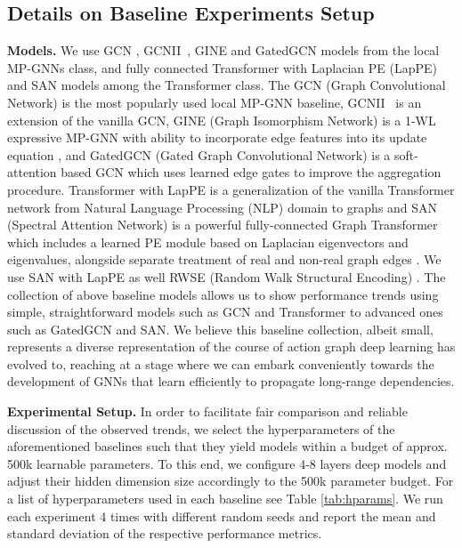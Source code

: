 \documentclass{article}
\begin{document}
\subsection{Details on Baseline Experiments Setup}

\textbf{Models.} We use GCN \cite{kipf2016gcn}, GCNII~\cite{chen2020GCNII}, GINE \cite{xu2018powerful_gin, hu2019strategies} and GatedGCN \cite{bresson2017gatedGCN} models from the local MP-GNNs class, and fully connected Transformer \cite{vaswani_2017_attention} with Laplacian PE (LapPE) \cite{dwivedi2020benchmarking, dwivedi2020generalization} and SAN \cite{kreuzer2021rethinking} models among the Transformer class. The GCN (Graph Convolutional Network) is the most popularly used local MP-GNN baseline, GCNII~\cite{chen2020GCNII} is an extension of the vanilla GCN, GINE (Graph Isomorphism Network) is a 1-WL expressive MP-GNN with ability to incorporate edge features into its update equation \cite{hu2019strategies}, and GatedGCN (Gated Graph Convolutional Network) is a soft-attention based GCN which uses learned edge gates to improve the aggregation procedure. Transformer with LapPE is a generalization of the vanilla Transformer network \cite{vaswani_2017_attention} from Natural Language Processing (NLP) domain to graphs and SAN (Spectral Attention Network) is a powerful fully-connected Graph Transformer which includes a learned PE module based on Laplacian eigenvectors and eigenvalues, alongside separate treatment of real and non-real graph edges \cite{kreuzer2021rethinking}. We use SAN with LapPE as well RWSE (Random Walk Structural Encoding) \cite{dwivedi2022graph}. The collection of above baseline models allows us to show performance trends using simple, straightforward models such as GCN and Transformer to advanced ones such as GatedGCN and SAN. We believe this  baseline collection, albeit small, represents a diverse representation of the course of action graph deep learning has evolved to, reaching at a stage where we can embark conveniently towards the development of GNNs that learn efficiently to propagate long-range dependencies. 

\textbf{Experimental Setup.} In order to facilitate fair comparison and reliable discussion of the observed trends, we select the hyperparameters of the aforementioned baselines such that they yield models within a budget of approx. 500k learnable parameters. To this end, we configure 4-8 layers deep models and adjust their hidden dimension size accordingly to the 500k parameter budget. For a list of hyperparameters used in each baseline see Table \ref{tab:hparams}. We run each experiment 4 times with different random seeds and report the mean and standard deviation of the respective performance metrics.
\end{document}
